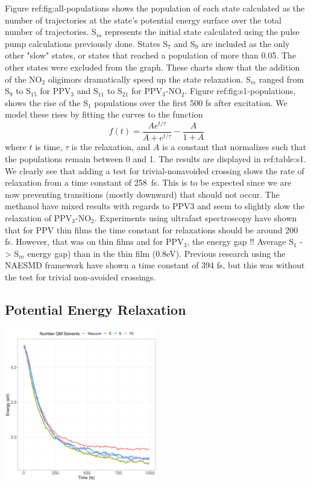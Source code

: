 Figure ref:fig:all-populations shows the population of each state calculated as
the number of trajectories at the state's potential energy surface over the
total number of trajectories. S\(_m\) represents the initial state calculated using
the pulse pump calculations previously done. States S\(_7\) and S\(_9\) are included as
the only other "slow" states, or states that reached a population of more than
0.05. The other states were excluded from the graph. These charts show that the
addition of the NO\(_2\) oligimors dramatically speed up the state relaxation. S\(_m\)
ranged from S\(_9\) to S\(_15\) for PPV\(_3\) and S\(_11\) to S\(_21\) for PPV\(_{3}\)-NO\(_{2}\). Figure
ref:fig:s1-populations, shows the rise of the S\(_{1}\) populations over the first
500 fs after excitation. We model these rises by fitting the curves to the
function
\begin{equation}
f(t) = \frac{Ae^{t/\tau}}{A+e^{t/\tau}} - \frac{A}{1+A}
\end{equation}
where $t$ is time, $\tau$ is the relaxation, and $A$ is a constant that
normalizes such that the populations remain between 0 and 1. The results are displayed in ref:table:s1. 
We clearly see that adding a test for trivial-nonavoided crossing slows the rate
of relaxation from a time constant of 258~fs. This is to be expected since we
are now preventing transitions (mostly downward) that should not occur. The
methanol have mixed results with regards to PPV3 and seem to slightly slow the
relaxation of PPV\(_3\)-NO\(_2\). Experiments using ultrafast spectroscopy have shown that
for PPV thin films the time constant for relaxations should be around 200 fs.
However, that was on thin films and for PPV\(_3\), the energy gap !! Average S\(_1\) ->
S\(_m\) energy gap) than in the thin film (0.8eV). Previous research using the
NAESMD framework have shown a time constant of 394 fs, but this was without the
test for trivial non-avoided crossings.

\subsection{Potential Energy Relaxation}

\noindent
\begin{minipage}[c]{\textwidth}
  \centering
  \includegraphics[width=0.5\textwidth]{../Paper2/Images/potential_energies/solvent_comparison.png}
  \label{}
\end{minipage}\bigskip


